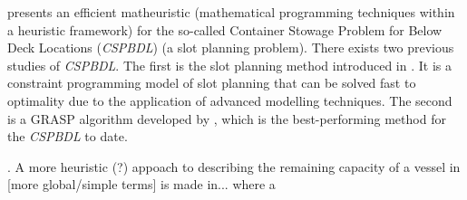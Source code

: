 \citet{Korach19} presents an efficient matheuristic (mathematical programming techniques within a heuristic framework) for the so-called Container Stowage Problem for Below Deck Locations (\textit{CSPBDL}) (a slot planning problem). There exists two previous studies of \textit{CSPBDL}. The first is the slot planning method introduced in \cite{DJJRA12}. It is a constraint programming  model of slot planning that can be solved fast to optimality due to the application of advanced modelling techniques. The second is a GRASP algorithm developed by \citet{PPAV16}, which is the best-performing method for the \textit{CSPBDL} to date. 




. 
A more heuristic (?) appoach to describing the remaining capacity of a vessel in [more global/simple terms] is made in... where a   

